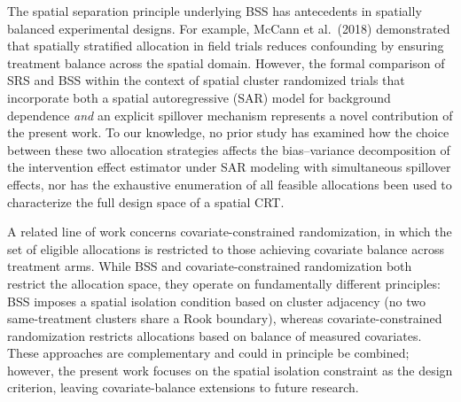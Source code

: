 \documentclass{article}[11pt]
\begin{document}
The spatial separation principle underlying BSS has antecedents in spatially balanced experimental designs. For example, McCann et al.~(2018) demonstrated that spatially stratified allocation in field trials reduces confounding by ensuring treatment balance across the spatial domain\cite{mccann_spatial_2018}. However, the formal comparison of SRS and BSS within the context of spatial cluster randomized trials that incorporate both a spatial autoregressive (SAR) model for background dependence \emph{and} an explicit spillover mechanism represents a novel contribution of the present work. To our knowledge, no prior study has examined how the choice between these two allocation strategies affects the bias--variance decomposition of the intervention effect estimator under SAR modeling with simultaneous spillover effects, nor has the exhaustive enumeration of all feasible allocations been used to characterize the full design space of a spatial CRT.

A related line of work concerns covariate-constrained randomization, in which the set of eligible allocations is restricted to those achieving covariate balance across treatment arms\cite{crisp_covariate-constrained_2023}. While BSS and covariate-constrained randomization both restrict the allocation space, they operate on fundamentally different principles: BSS imposes a spatial isolation condition based on cluster adjacency (no two same-treatment clusters share a Rook boundary), whereas covariate-constrained randomization restricts allocations based on balance of measured covariates. These approaches are complementary and could in principle be combined; however, the present work focuses on the spatial isolation constraint as the design criterion, leaving covariate-balance extensions to future research.
\end{document}
